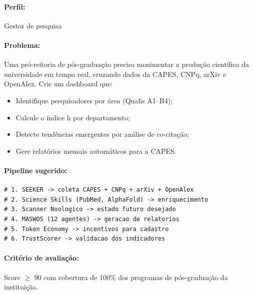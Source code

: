 \begin{exercicio}
\label{ex:cienciometria}

\paragraph{Perfil:} Gestor de pesquisa \hfill \nivelavancado

\paragraph{Problema:} Uma pró-reitoria de pós-graduação precisa
monimentar a produção científica da universidade em tempo real,
cruzando dados da CAPES, CNPq, arXiv e OpenAlex. Crie um
dashboard que:

\begin{itemize}
    \item Identifique pesquisadores por área (Qualis A1--B4);
    \item Calcule o índice h por departamento;
    \item Detecte tendências emergentes por análise de
          co-citação;
    \item Gere relatórios mensais automáticos para a CAPES.
\end{itemize}

\paragraph{Pipeline sugerido:}
\begin{lstlisting}[style=bashstyle, basicstyle=\ttfamily\small]
# 1. SEEKER -> coleta CAPES + CNPq + arXiv + OpenAlex
# 2. Science Skills (PubMed, AlphaFold) -> enriquecimento
# 3. Scanner Noologico -> estado futuro desejado
# 4. MASWOS (12 agentes) -> geracao de relatorios
# 5. Token Economy -> incentivos para cadastro
# 6. TrustScorer -> validacao dos indicadores
\end{lstlisting}

\paragraph{Critério de avaliação:} Score $\ge$ 90 com cobertura
de 100\% dos programas de pós-graduação da instituição.

\end{exercicio}

